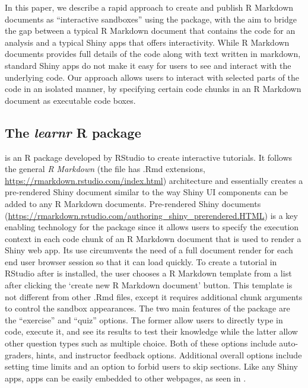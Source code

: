 In this paper, we describe a rapid approach to create and publish R
Markdown documents as ``interactive sandboxes'' using the
 package, with the aim to bridge the gap between a
typical R Markdown document that contains the code for an analysis and a
typical Shiny apps that offers interactivity. While R Markdown documents
provides full details of the code along with text written in markdown,
standard Shiny apps do not make it easy for users to see and interact
with the underlying code. Our approach allows users to interact with
selected parts of the code in an isolated manner, by specifying certain
code chunks in an R Markdown document as executable code boxes.

\hypertarget{the-learnr-r-package}{%
\subsection{\texorpdfstring{The \emph{learnr} R
package}{The learnr R package}}\label{the-learnr-r-package}}

 \citep{learnr} is an R package developed by RStudio to
create interactive tutorials. It follows the general \emph{R Markdown}
(the file has .Rmd extensions,
\url{https://rmarkdown.rstudio.com/index.html}) architecture and
essentially creates a pre-rendered Shiny document similar to the way
Shiny UI components can be added to any R Markdown documents.
Pre-rendered Shiny documents
(\url{https://rmarkdown.rstudio.com/authoring_shiny_prerendered.HTML})
is a key enabling technology for the  package since it
allows users to specify the execution context in each code chunk of an R
Markdown document that is used to render a Shiny web app. Its use
circumvents the need of a full document render for each end user browser
session so that it can load quickly. To create a 
tutorial in RStudio after  is installed, the user
chooses a  R Markdown template from a list after
clicking the `create new R Markdown document' button. This template is
not different from other .Rmd files, except it requires additional chunk
arguments to control the sandbox appearances. The two main features of
the  package are the ``exercise'' and ``quiz'' options.
The former allow users to directly type in code, execute it, and see its
results to test their knowledge while the latter allow other question
types such as multiple choice. Both of these options include
auto-graders, hints, and instructor feedback options. Additional overall
options include setting time limits and an option to forbid users to
skip sections. Like any Shiny apps,  apps can be easily
embedded to other webpages, as seen in \citet{rmrwr}.

